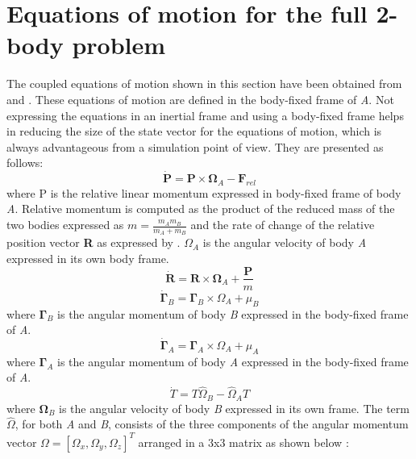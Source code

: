 \section{Equations of motion for the full 2-body problem}
\label{F2BP_EOM}
The coupled equations of motion shown in this section have been obtained from \cite{fahn_poly} and \cite{macie}. These equations of motion are defined in the body-fixed frame of \textit{A}. Not expressing the equations in an inertial frame and using a body-fixed frame helps in reducing the size of the state vector for the equations of motion, which is always advantageous from a simulation point of view. They are presented as follows:
\begin{equation}
\label{p_eom}
\mathbf{\dot{P}} = \mathbf{P} \times \mathbf{\Omega}_A - \mathbf{F}_{rel}
\end{equation}
%
where P is the relative linear momentum expressed in body-fixed frame of body \textit{A}. Relative momentum is computed as the product of the reduced mass of the two bodies expressed as $m = \frac{m_A m_B}{m_A + m_B}$ and the rate of change of the relative position vector \textbf{R} as expressed by . $\Omega_A$ is the angular velocity of body \textit{A} expressed in its own body frame.
\begin{equation}
\label{r_eom}
\mathbf{\dot{R}} = \mathbf{R} \times \mathbf{\Omega}_A + \frac{\mathbf{P}}{m}
\end{equation}
%
\begin{equation}
\label{ang_mom_b}
\mathbf{\dot{\Gamma}}_B = \mathbf{\Gamma}_B \times \Omega_A + \mu_B
\end{equation}
%
where $\mathbf{\Gamma}_B$ is the angular momentum of body \textit{B} expressed in the body-fixed frame of \textit{A}.
\begin{equation}
\label{ang_mom_a}
\mathbf{\dot{\Gamma}}_A = \mathbf{\Gamma}_A \times \Omega_A + \mu_A
\end{equation}
%
where $\mathbf{\Gamma}_A$ is the angular momentum of body \textit{A} expressed in the body-fixed frame of \textit{A}.
\begin{equation}
\label{T_eom}
\dot{T} = T \hat{\Omega}_B - \hat{\Omega}_A T
\end{equation}
%
where $\mathbf{\Omega}_B$ is the angular velocity of body \textit{B} expressed in its own frame. The term $\hat{\Omega}$, for both \textit{A} and \textit{B}, consists of the three components of the angular momentum vector $\Omega = [\Omega_x, \Omega_y, \Omega_z]^T$ arranged in a 3x3 matrix as shown below \cite{macie}:
